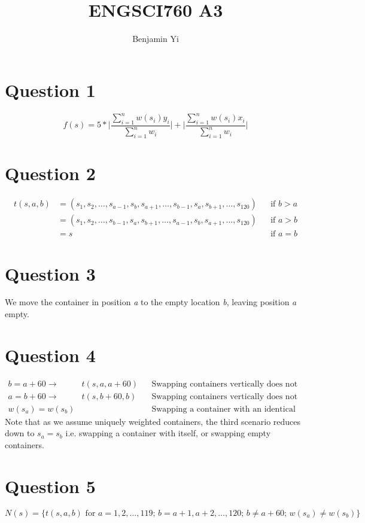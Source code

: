 \documentclass[10pt,a4paper]{article}
\begin{document}
\title{ENGSCI760 A3}
\author{Benjamin Yi}
	
\section*{Question 1}
\begin{equation*}
f(s) = 5*\bigg| \frac{\sum^n_{i=1} w(s_i)y_i}{\sum^n_{i=1}w_i} \bigg| + \bigg| \frac{\sum^n_{i=1} w(s_i)x_i}{\sum^n_{i=1}w_i} \bigg|
\end{equation*}

\section*{Question 2}
\begin{align*}
t(s, a, b) &= (s_1, s_2, \dots , s_{a-1}, s_b, s_{a+1}, \dots, s_{b-1}, s_a, s_{b+1}, \dots, s_{120}) && \text{if } b > a \\
 &= (s_1, s_2, \dots , s_{b-1}, s_a, s_{b+1}, \dots, s_{a-1}, s_b, s_{a+1}, \dots, s_{120}) && \text{if } a > b \\
&= s && \text{if } a = b
\end{align*}

\section*{Question 3}
We move the container in position \textit{a} to the empty location \textit{b}, leaving position \textit{a} empty.

\section*{Question 4}
\begin{align*}
b = a + 60\longrightarrow &t(s, a, a + 60) && \text{Swapping containers vertically does not change anything} \\
a = b + 60\longrightarrow &t(s, b + 60, b) && \text{Swapping containers vertically does not change anything} \\
w(s_a) = w(s_b) & && \text{Swapping a container with an identical container does nothing}
\end{align*}
Note that as we assume uniquely weighted containers, the third scenario reduces down to \(s_a = s_b\) i.e. swapping a container with itself, or swapping empty containers.

\section*{Question 5}
\begin{equation*}
N(s) = \bigg\{t(s,a,b) \text{ for } a=1,2,\dots,119; \, b=a+1,a+2,\dots,120; \, b \neq a+60; \, w(s_a) \neq w(s_b)\bigg\}
\end{equation*}
\end{document}
